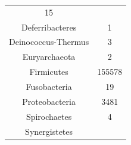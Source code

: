 \documentclass[12pt,twoside]{dukestatscithesis}
\begin{document}
\begin{longtable}[]{@{}cc@{}}
\begin{minipage}[t]{0.20\columnwidth}
15\strut
\end{minipage}\tabularnewline
\begin{minipage}[t]{0.39\columnwidth}\centering\strut
Deferribacteres\strut
\end{minipage} & \begin{minipage}[t]{0.20\columnwidth}\centering\strut
1\strut
\end{minipage}\tabularnewline
\begin{minipage}[t]{0.39\columnwidth}\centering\strut
Deinococcus-Thermus\strut
\end{minipage} & \begin{minipage}[t]{0.20\columnwidth}\centering\strut
3\strut
\end{minipage}\tabularnewline
\begin{minipage}[t]{0.39\columnwidth}\centering\strut
Euryarchaeota\strut
\end{minipage} & \begin{minipage}[t]{0.20\columnwidth}\centering\strut
2\strut
\end{minipage}\tabularnewline
\begin{minipage}[t]{0.39\columnwidth}\centering\strut
Firmicutes\strut
\end{minipage} & \begin{minipage}[t]{0.20\columnwidth}\centering\strut
155578\strut
\end{minipage}\tabularnewline
\begin{minipage}[t]{0.39\columnwidth}\centering\strut
Fusobacteria\strut
\end{minipage} & \begin{minipage}[t]{0.20\columnwidth}\centering\strut
19\strut
\end{minipage}\tabularnewline
\begin{minipage}[t]{0.39\columnwidth}\centering\strut
Proteobacteria\strut
\end{minipage} & \begin{minipage}[t]{0.20\columnwidth}\centering\strut
3481\strut
\end{minipage}\tabularnewline
\begin{minipage}[t]{0.39\columnwidth}\centering\strut
Spirochaetes\strut
\end{minipage} & \begin{minipage}[t]{0.20\columnwidth}\centering\strut
4\strut
\end{minipage}\tabularnewline
\begin{minipage}[t]{0.39\columnwidth}\centering\strut
Synergistetes\strut

\end{minipage}
\end{longtable}
\end{document}
